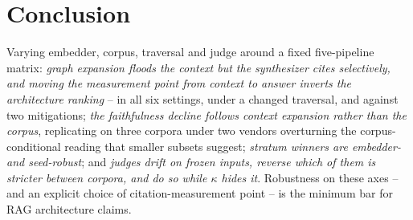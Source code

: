 \section{Conclusion}
\label{sec:conclusion}
Varying embedder, corpus, traversal and judge around a fixed
five-pipeline matrix: \emph{graph expansion floods the context but the
synthesizer cites selectively, and moving the measurement point from
context to answer inverts the architecture ranking} -- in all six
settings, under a changed traversal, and against two mitigations;
\emph{the faithfulness decline follows context expansion rather than the
corpus}, replicating on three corpora under two vendors overturning
the corpus-conditional reading that smaller subsets suggest; \emph{stratum
winners are embedder- and seed-robust}; and \emph{judges drift on frozen
inputs, reverse which of them is stricter between corpora, and do so
while $\kappa$ hides it}. Robustness on these axes -- and an
explicit choice of citation-measurement point -- is the minimum bar for
RAG architecture claims.
